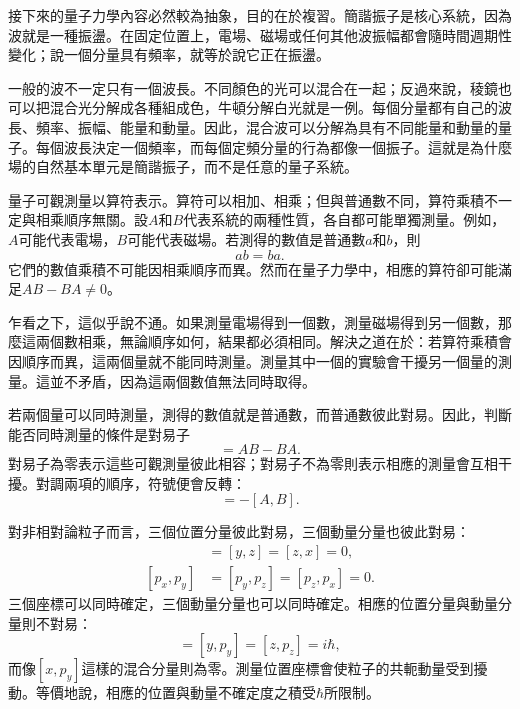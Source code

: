 接下來的量子力學內容必然較為抽象，目的在於複習。簡諧振子是核心系統，因為波就是一種振盪。在固定位置上，電場、磁場或任何其他波振幅都會隨時間週期性變化；說一個分量具有頻率，就等於說它正在振盪。

一般的波不一定只有一個波長。不同顏色的光可以混合在一起；反過來說，稜鏡也可以把混合光分解成各種組成色，牛頓分解白光就是一例。每個分量都有自己的波長、頻率、振幅、能量和動量。因此，混合波可以分解為具有不同能量和動量的量子。每個波長決定一個頻率，而每個定頻分量的行為都像一個振子。這就是為什麼場的自然基本單元是簡諧振子，而不是任意的量子系統。

量子可觀測量以算符表示。算符可以相加、相乘；但與普通數不同，算符乘積不一定與相乘順序無關。設\(A\)和\(B\)代表系統的兩種性質，各自都可能單獨測量。例如，\(A\)可能代表電場，\(B\)可能代表磁場。若測得的數值是普通數\(a\)和\(b\)，則
\begin{equation}
ab=ba.
\end{equation}
它們的數值乘積不可能因相乘順序而異。然而在量子力學中，相應的算符卻可能滿足\(AB-BA\neq0\)。

乍看之下，這似乎說不通。如果測量電場得到一個數，測量磁場得到另一個數，那麼這兩個數相乘，無論順序如何，結果都必須相同。解決之道在於：若算符乘積會因順序而異，這兩個量就不能同時測量。測量其中一個的實驗會干擾另一個量的測量。這並不矛盾，因為這兩個數值無法同時取得。

若兩個量可以同時測量，測得的數值就是普通數，而普通數彼此對易。因此，判斷能否同時測量的條件是對易子
\begin{equation}
[A,B]=AB-BA.
\end{equation}
對易子為零表示這些可觀測量彼此相容；對易子不為零則表示相應的測量會互相干擾。對調兩項的順序，符號便會反轉：
\begin{equation}
[B,A]=-[A,B].
\end{equation}

對非相對論粒子而言，三個位置分量彼此對易，三個動量分量也彼此對易：
\begin{align}
[x,y]&=[y,z]=[z,x]=0,\\
[p_x,p_y]&=[p_y,p_z]=[p_z,p_x]=0.
\end{align}
三個座標可以同時確定，三個動量分量也可以同時確定。相應的位置分量與動量分量則不對易：
\begin{equation}
[x,p_x]=[y,p_y]=[z,p_z]=i\hbar,
\end{equation}
而像\([x,p_y]\)這樣的混合分量則為零。測量位置座標會使粒子的共軛動量受到擾動。等價地說，相應的位置與動量不確定度之積受\(\hbar\)所限制。

\begin{classroomqa}
\end{classroomqa}

